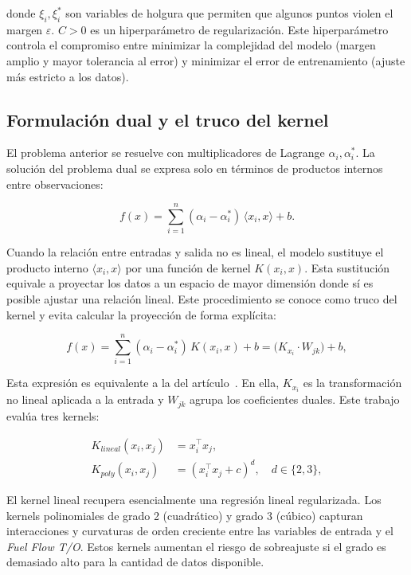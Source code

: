 donde $\xi_i,\xi_i^*$ son variables de holgura que permiten que algunos puntos violen el margen $\varepsilon$. $C>0$ es un hiperparámetro de regularización. Este hiperparámetro controla el compromiso entre minimizar la complejidad del modelo (margen amplio y mayor tolerancia al error) y minimizar el error de entrenamiento (ajuste más estricto a los datos).

\subsection{Formulación dual y el truco del kernel}

El problema anterior se resuelve con multiplicadores de Lagrange $\alpha_i,\alpha_i^*$. La solución del problema dual se expresa solo en términos de productos internos entre observaciones:

\begin{equation}
f(x) = \sum_{i=1}^n (\alpha_i-\alpha_i^*)\, \langle x_i, x\rangle + b.
\label{eq:svr_dual}
\end{equation}

Cuando la relación entre entradas y salida no es lineal, el modelo sustituye el producto interno $\langle x_i,x\rangle$ por una función de kernel $K(x_i,x)$. Esta sustitución equivale a proyectar los datos a un espacio de mayor dimensión donde sí es posible ajustar una relación lineal. Este procedimiento se conoce como truco del kernel y evita calcular la proyección de forma explícita:

\begin{equation}
f(x) = \sum_{i=1}^n (\alpha_i-\alpha_i^*)\, K(x_i,x) + b = \big(K_{x_i}\cdot W_{jk}\big) + b,
\label{eq:svr_kernel}
\end{equation}

Esta expresión es equivalente a la del artículo~\cite{Kurt2024}. En ella, $K_{x_i}$ es la transformación no lineal aplicada a la entrada y $W_{jk}$ agrupa los coeficientes duales. Este trabajo evalúa tres kernels:

\begin{align}
K_{lineal}(x_i,x_j) &= x_i^\top x_j, \label{eq:kernel_lineal}\\
K_{poly}(x_i,x_j) &= (x_i^\top x_j + c)^d, \quad d\in\{2,3\}, \label{eq:kernel_poly}
\end{align}

El kernel lineal recupera esencialmente una regresión lineal regularizada. Los kernels polinomiales de grado 2 (cuadrático) y grado 3 (cúbico) capturan interacciones y curvaturas de orden creciente entre las variables de entrada y el \textit{Fuel Flow T/O}. Estos kernels aumentan el riesgo de sobreajuste si el grado es demasiado alto para la cantidad de datos disponible.

